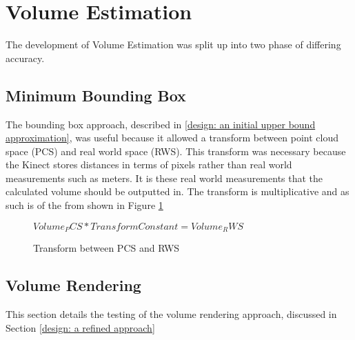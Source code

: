 \section{Volume Estimation}
\label{volume estimation}
The development of Volume Estimation was split up into two phase of differing accuracy.
\subsection{Minimum Bounding Box}
\label{testing: minimum bounding box}
The bounding box approach, described in \ref{design: an initial upper bound approximation}, was useful because it allowed a transform between point cloud space (PCS) and real world space (RWS). This transform was necessary because the Kinect stores distances in terms of pixels rather than real world measurements such as meters. It is these real world measurements that the calculated volume should be outputted in. The transform is multiplicative and as such is of the from shown in Figure \ref{testing: transform between pcs and rws}

\begin{figure}
\begin{center}
$Volume_PCS * Transform Constant = Volume_RWS$
\end{center}
\caption{Transform between PCS and RWS}
\label{testing: transform between pcs and rws}
\end{figure}

\subsection{Volume Rendering}
\label{testing: volume rendering}
This section details the testing of the volume rendering approach, discussed in Section \ref{design: a refined approach}